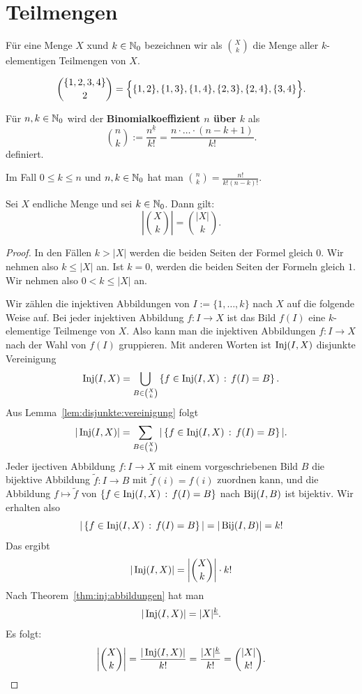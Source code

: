 \section{Teilmengen} 

\begin{defn}
Für eine Menge $X$ xund $k \in \mathbb{N}_0$ bezeichnen wir als $\binom{X}{k}$ die Menge aller $k$-elementigen Teilmengen von $X$. 
\end{defn}

\begin{bsp}
	\[
	\binom{\{1,2,3,4\}}{2} = \Bigl\{ \{1,2\},\{1,3\}, \{1,4\}, \{2,3\}, \{2,4\} ,\{3,4\} \Bigr\}.
	\]
\end{bsp} 


\begin{defn}
	Für $n,k \in \mathbb{N}_0$ wird der \textbf{Binomialkoeffizient  $n$ über $k$} als 
	\[
		\binom{n}{k}:= \frac{n^{\underline{k}}}{k!}  = \frac{n \cdot \ldots \cdot (n-k+1)}{k!}.
	\]
	definiert. 
\end{defn} 

\begin{bem}
	Im Fall $0 \le k \le n$ und $n,k \in \mathbb{N}_0$ hat man $\binom{n}{k} = \frac{n!}{k! (n-k)!}$. 
\end{bem} 


\begin{thm} \label{thm:k:elem:teilmengen} 
		Sei $X$ endliche Menge und sei $k \in \mathbb{N}_0$. Dann gilt: 
		\[
				\left| \binom{X}{k} \right| = \binom{|X|}{k}. 
		\]
\end{thm} 
\begin{proof} 
	In den Fällen $k > |X|$ werden die beiden Seiten der Formel gleich $0$. Wir nehmen also $k \le |X|$ an. Ist $k=0$, werden die beiden Seiten der Formeln gleich $1$. Wir nehmen also $0 < k \le |X|$ an. 
	
	Wir zählen die injektiven Abbildungen von $I:=\{1,\ldots,k\}$ nach $X$ auf die folgende  Weise auf. Bei jeder injektiven Abbildung $f : I \to X$ ist das Bild $f(I)$ eine $k$-elementige Teilmenge von $X$. Also kann man die injektiven Abbildungen $f: I \to X$  nach der Wahl von $f(I)$ gruppieren. Mit anderen Worten ist $\operatorname{Inj}(I,X)$ disjunkte Vereinigung
	\[
		\operatorname{Inj}(I,X)  = \bigcup_{B \in \binom{X}{k} } \left\{ f \in \operatorname{Inj}(I,X) \,:\, f(I) = B \right\}. 
	\]
	Aus Lemma~\ref{lem:disjunkte:vereinigung} folgt
	\[
		|\operatorname{Inj}(I,X) | = \sum_{B \in \binom{X}{k} } | \left\{ f \in \operatorname{Inj}(I,X) \,:\, f(I) = B \right\}|. 
	\]
	Jeder ijectiven Abbildung $ f: I \to X$ mit einem vorgeschriebenen Bild $B$ 
	die bijektive Abbildung $\tilde{f} : I \to B$ mit $\tilde{f}(i) = f(i)$ zuordnen kann, und die Abbildung $f \mapsto \tilde{f}$ von $\left\{ f \in \operatorname{Inj}(I,X) \,:\, f(I) = B \right\}$ nach $\operatorname{Bij}(I,B)$ ist bijektiv. 
	Wir erhalten also 
	\[
			| \left\{ f \in \operatorname{Inj}(I,X) \,:\, f(I) = B \right\}| = |\operatorname{Bij}(I,B)| = k!
	\]
	Das ergibt
	\[
		|\operatorname{Inj}(I,X) | = \left| \binom{X}{k} \right| \cdot k!
	\]
	Nach Theorem~\ref{thm:inj:abbildungen} hat man 
	\[
		|\operatorname{Inj}(I,X)| = |X|^{\underline{k}}. 
	\]
	Es folgt: 
	\[
		\left| \binom{X}{k} \right| = \frac{|\operatorname{Inj}(I,X) |}{k!} = \frac{|X|^{\underline{k}}}{k!} = \binom{|X|}{k!}. 
	\]
\end{proof} 

